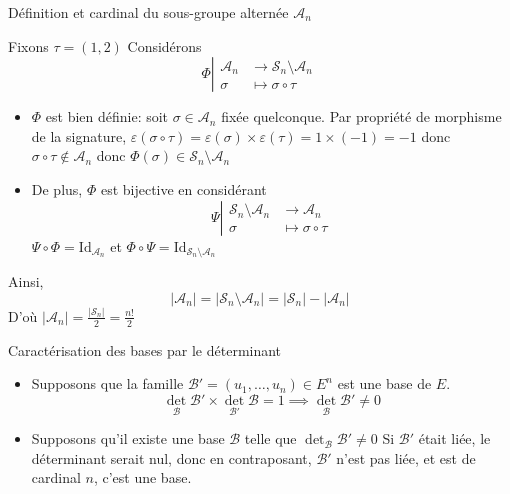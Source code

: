 \documentclass{article}
\renewenvironment{question_kholle}[2][ ]
{
	\subsection{\texorpdfstring{#2}{}}
	\notblank{#1}
	{
		\noindent #1
		\bigbreak
	}
	{}
	\begin{proof}
}
{
	\end{proof}
}
\begin{document}
\begin{question_kholle}[{Le noyau d'un morphisme de groupe étant toujours un sous-groupe du groupe de départ, le groupe alterné d'indice $n \in \N^{*}$ est le sous groupe de $(\mathcal{S}_{n}, \circ)$ obtenu en considérant le noyau du morphisme signature.
				$$
					\mathcal{A}_{n}= \ker \varepsilon
				$$
				$\mathcal{A}_{n}$ est de cardinal $\frac{n!}{2}$.
			}]{Définition et cardinal du sous-groupe alternée $\mathcal{A}_n$}


	Fixons $\tau = (1, 2)$
	Considérons
	$$\Phi \left|\begin{array}{ll} \mathcal{A}_{n} &\to \mathcal{S}_{n} \setminus \mathcal{A}_{n} \\ \sigma &\mapsto \sigma \circ \tau \end{array}\right.$$
	\begin{itemize}
		\item

		      $\Phi$ est bien définie: soit $\sigma \in \mathcal{A}_{n}$ fixée quelconque. Par propriété de morphisme de la signature, $\varepsilon(\sigma \circ \tau) = \varepsilon(\sigma) \times \varepsilon(\tau) = 1 \times (-1) = -1$ donc $\sigma \circ \tau \not\in \mathcal{A}_{n}$ donc $\Phi(\sigma) \in \mathcal{S}_{n}\setminus \mathcal{A}_{n}$

		\item De plus, $\Phi$ est bijective en considérant
		      $$\Psi\left|\begin{array}{ll} \mathcal{S}_{n}\setminus \mathcal{A}_{n} &\to \mathcal{A}_{n} \\ \sigma &\mapsto \sigma \circ  \tau \end{array}\right.$$
		      $\Psi \circ \Phi = \mathrm{Id}_{\mathcal{A}_{n}}$ et $\Phi \circ \Psi = \mathrm{Id}_{\mathcal{S}_{n}\setminus \mathcal{A}_{n}}$
	\end{itemize}
	Ainsi,
	$$
		\lvert \mathcal{A}_{n} \rvert  = \lvert \mathcal{S}_{n}\setminus \mathcal{A}_{n} \rvert  = \lvert \mathcal{S}_{n} \rvert - \lvert \mathcal{A}_{n} \rvert
	$$
	D'où $\lvert \mathcal{A}_{n} \rvert = \frac{\lvert \mathcal{S}_{n} \rvert}{2} = \frac{n!}{2}$
\end{question_kholle}

\begin{question_kholle}{Caractérisation des bases par le déterminant}
	~\\
	\begin{itemize}[label=$\star$]
		\item Supposons que la famille $\mathcal{B'} =(u_{1}, \dots, u_{n}) \in E^{n}$ est une base de $E$.
		      $$\det_{\mathcal{B}}\mathcal{B'}\times \det_{\mathcal{B'}}\mathcal{B} = 1 \implies \det _{\mathcal{B}}\mathcal{B'} \neq 0$$

		\item Supposons qu'il existe une base $\mathcal{B}$ telle que $\det_{\mathcal{B}} \mathcal{B}' \neq 0$
		      Si $\mathcal{B}'$ était liée, le déterminant serait nul, donc en contraposant, $\mathcal{B}'$ n'est pas liée, et est de cardinal $n$, c'est une base.
	\end{itemize}
\end{question_kholle}
\end{document}
